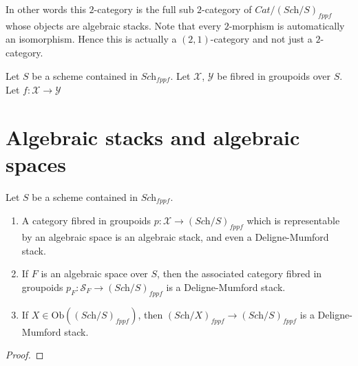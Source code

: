 \noindent
In other words this $2$-category is the full sub $2$-category of
$\textit{Cat}/(\textit{Sch}/S)_{fppf}$ whose objects are algebraic stacks.
Note that every $2$-morphism is automatically an isomorphism.
Hence this is actually a $(2, 1)$-category and not just a
$2$-category.

\begin{lemma}
\label{lemma-equivalent}
Let $S$ be a scheme contained in $\textit{Sch}_{fppf}$.
Let $\mathcal{X}$, $\mathcal{Y}$ be fibred in groupoids over $S$.
Let $f : \mathcal{X} \to \mathcal{Y}$
\end{lemma}




\section{Algebraic stacks and algebraic spaces}
\label{section-stacks-spaces}





\begin{lemma}
\label{lemma-representable-algebraic}
Let $S$ be a scheme contained in $\textit{Sch}_{fppf}$.
\begin{enumerate}
\item A category fibred in groupoids
$p : \mathcal{X} \to (\textit{Sch}/S)_{fppf}$
which is representable by an algebraic space is an algebraic stack,
and even a Deligne-Mumford stack.
\item If $F$ is an algebraic space over $S$, then the associated
category fibred in groupoids
$p_F : \mathcal{S}_F \to (\textit{Sch}/S)_{fppf}$
is a Deligne-Mumford stack.
\item If $X \in \text{Ob}((\textit{Sch}/S)_{fppf})$, then
$(\textit{Sch}/X)_{fppf} \to (\textit{Sch}/S)_{fppf}$ is
a Deligne-Mumford stack.
\end{enumerate}
\end{lemma}

\begin{proof}

\end{proof}





















